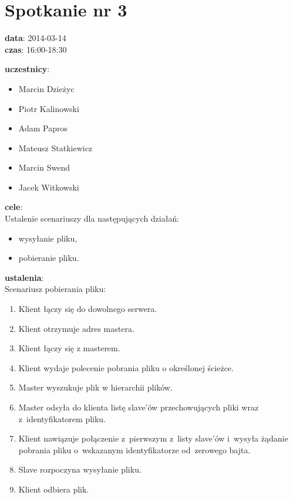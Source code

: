 \section[Spotkanie nr 3][Spotkanie nr 3]{Spotkanie nr 3}

\noindent
\textbf{data}: 2014-03-14 \\
\textbf{czas}: 16:00-18:30

\vspace{5mm}
\noindent
\textbf{uczestnicy}:
\begin{itemize}
	\item Marcin Dzieżyc
	\item Piotr Kalinowski
	\item Adam Papros
	\item Mateusz Statkiewicz
	\item Marcin Swend
	\item Jacek Witkowski
\end{itemize}

\vspace{5mm}
\noindent
\textbf{cele}: \\
Ustalenie scenariuszy dla następujących działań:
\begin{itemize}
  \item wysyłanie pliku,
  \item pobieranie pliku.
\end{itemize}

\vspace{5mm}
\noindent
\textbf{ustalenia}: \\
Scenariusz pobierania pliku:
\begin{enumerate}
	\item Klient łączy się do dowolnego serwera.
	\item Klient otrzymuje adres mastera.
	\item Klient łączy się z masterem.
	\item Klient wydaje polecenie pobrania pliku o określonej ścieżce.
	\item Master wyszukuje plik w hierarchii plików.
	\item Master odsyła do klienta listę slave'ów przechowujących pliki wraz
	z~identyfikatorem pliku.
	\item Klient nawiązuje połączenie z~pierwszym z~listy slave'ów i~wysyła żądanie
	pobrania pliku o~wskazanym identyfikatorze od~zerowego bajta.
	\item Slave rozpoczyna wysyłanie pliku.
	\item Klient odbiera plik.
\end{enumerate}

